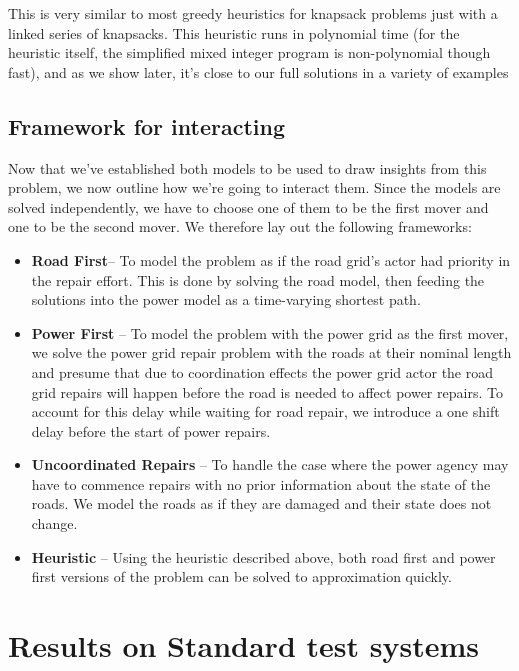 \documentclass{article}
\begin{document}
	This is very similar to most greedy heuristics for knapsack problems just with a linked series of knapsacks. This heuristic runs in polynomial time (for the heuristic itself, the simplified mixed integer program is non-polynomial though fast), and as we show later, it's close to our full solutions in a variety of examples
	
	\subsection{Framework for interacting}
	Now that we've established both models to be used to draw insights from this problem, we now outline how we're going to interact them. Since the models are solved independently, we have to choose one of them to be the first mover and one to be the second mover. We therefore lay out the following frameworks:
	\begin{itemize}
		\item \textbf{Road First}-- To model the problem as if the road grid's actor had priority in the repair effort. This is done by solving the road model, then feeding the solutions into the power model as a time-varying shortest path.
		\item \textbf{Power First} -- To model the problem with the power grid as the first mover, we solve the power grid repair problem with the roads at their nominal length and presume that due to coordination effects the power grid actor the road grid repairs will happen before the road is needed to affect power repairs. To account for this delay while waiting for road repair, we introduce a one shift delay before the start of power repairs.
		\item \textbf{Uncoordinated Repairs} -- To handle the case where the power agency may have to commence repairs with no prior information about the state of the roads. We model the roads as if they are damaged and their state does not change.
		\item \textbf{Heuristic} -- Using the heuristic described above, both road first and power first versions of the problem can be solved to approximation quickly.
	\end{itemize}
	\section{Results on Standard test systems}
\end{document}
